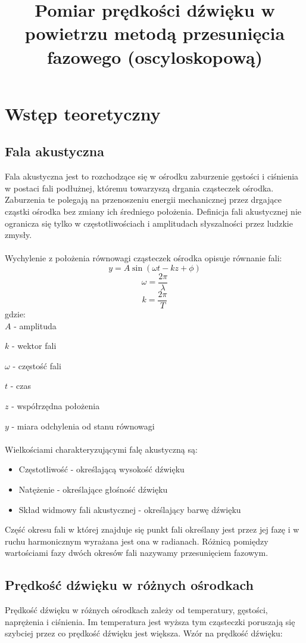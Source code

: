 \documentclass{article}
\begin{document}
\title{\huge\bfseries Pomiar prędkości dźwięku w powietrzu metodą przesunięcia fazowego (oscyloskopową)}
\date{}
\author{}
\maketitle
\section{Wstęp teoretyczny}
\subsection{Fala akustyczna}
Fala akustyczna jest to rozchodzące się w ośrodku zaburzenie gęstości i ciśnienia w postaci fali podłużnej, któremu towarzyszą drgania cząsteczek ośrodka. Zaburzenia te polegają na przenoszeniu energii mechanicznej przez drgające cząstki ośrodka bez zmiany ich średniego położenia. Definicja fali akustycznej nie ogranicza się tylko w częstotliwościach i amplitudach słyszalności przez ludzkie zmysły.\\\\
Wychylenie z położenia równowagi cząsteczek ośrodka opisuje równanie fali:
$$y = A\sin (\omega t - kz + \phi)$$
$$\omega = \frac{2\pi}{\lambda}$$
$$k = \frac{2\pi}{T}$$
gdzie:\\

 $A$ - amplituda
 
 $k$ - wektor fali
 
 $\omega$ - częstość fali
 
 $t$ - czas
 
 $z$ - współrzędna położenia
 
 $y$ - miara odchylenia od stanu równowagi\\\\ 
Wielkościami charakteryzującymi falę akustyczną są:
\begin{itemize}
    \item Częstotliwość - określającą wysokość dźwięku
    \item Natężenie - określające głośność dźwięku
    \item Skład widmowy fali akustycznej - określający barwę dźwięku
\end{itemize}
Część okresu fali w której znajduje się punkt fali określany jest przez jej fazę i w ruchu harmonicznym wyrażana jest ona w radianach. Różnicą pomiędzy wartościami fazy dwóch okresów fali nazywamy przesunięciem fazowym.
\subsection{Prędkość dźwięku w różnych ośrodkach}
Prędkość dźwięku w różnych ośrodkach zależy od temperatury, gęstości, naprężenia i ciśnienia. Im temperatura jest wyższa tym cząsteczki poruszają się szybciej przez co prędkość dźwięku jest większa. Wzór na prędkość dźwięku:
\end{document}
